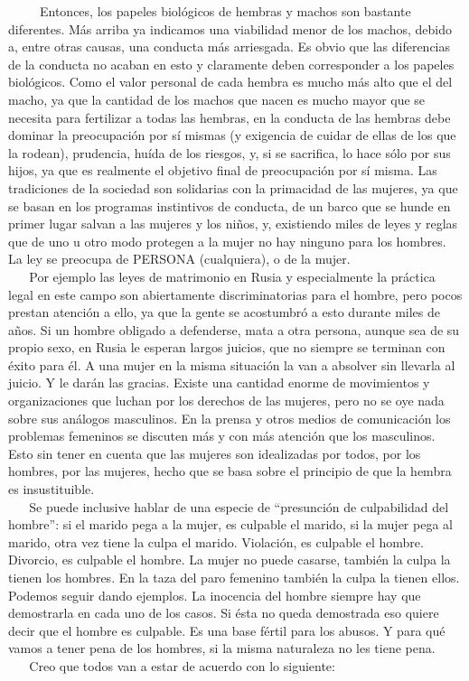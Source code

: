 ~ ~ ~ Entonces, los papeles biológicos de hembras y machos son bastante
diferentes. Más arriba ya indicamos una viabilidad menor de los machos,
debido a, entre otras causas, una conducta más arriesgada. Es obvio que
las diferencias de la conducta no acaban en esto y claramente deben
corresponder a los papeles biológicos. Como el valor personal de cada
hembra es mucho más alto que el del macho, ya que la cantidad de los
machos que nacen es mucho mayor que se necesita para fertilizar a todas
las hembras, en la conducta de las hembras debe dominar la preocupación
por sí mismas (y exigencia de cuidar de ellas de los que la rodean),
prudencia, huída de los riesgos, y, si se sacrifica, lo hace sólo por
sus hijos, ya que es realmente el objetivo final de preocupación por sí
misma. Las tradiciones de la sociedad son solidarias con la primacidad
de las mujeres, ya que se basan en los programas instintivos de
conducta, de un barco que se hunde en primer lugar salvan a las mujeres
y los niños, y, existiendo miles de leyes y reglas que de uno u otro
modo protegen a la mujer no hay ninguno para los hombres. La ley se
preocupa de PERSONA (cualquiera), o de la mujer.\\
\hspace*{0.333em} ~ ~ Por ejemplo las leyes de matrimonio en Rusia y
especialmente la práctica legal en este campo son abiertamente
discriminatorias para el hombre, pero pocos prestan atención a ello, ya
que la gente se acostumbró a esto durante miles de años. Si un hombre
obligado a defenderse, mata a otra persona, aunque sea de su propio
sexo, en Rusia le esperan largos juicios, que no siempre se terminan con
éxito para él. A una mujer en la misma situación la van a absolver sin
llevarla al juicio. Y le darán las gracias. Existe una cantidad enorme
de movimientos y organizaciones que luchan por los derechos de las
mujeres, pero no se oye nada sobre sus análogos masculinos. En la prensa
y otros medios de comunicación los problemas femeninos se discuten más y
con más atención que los masculinos. Esto sin tener en cuenta que las
mujeres son idealizadas por todos, por los hombres, por las mujeres,
hecho que se basa sobre el principio de que la hembra es insustituible.\\
\hspace*{0.333em} ~ ~ Se puede inclusive hablar de una especie de
``presunción de culpabilidad del hombre'': si el marido pega a la mujer,
es culpable el marido, si la mujer pega al marido, otra vez tiene la
culpa el marido. Violación, es culpable el hombre. Divorcio, es culpable
el hombre. La mujer no puede casarse, también la culpa la tienen los
hombres. En la taza del paro femenino también la culpa la tienen ellos.
Podemos seguir dando ejemplos. La inocencia del hombre siempre hay que
demostrarla en cada uno de los casos. Si ésta no queda demostrada eso
quiere decir que el hombre es culpable. Es una base fértil para los
abusos. Y para qué vamos a tener pena de los hombres, si la misma
naturaleza no les tiene pena.\\
\hspace*{0.333em} ~ ~ Creo que todos van a estar de acuerdo con lo
siguiente:

